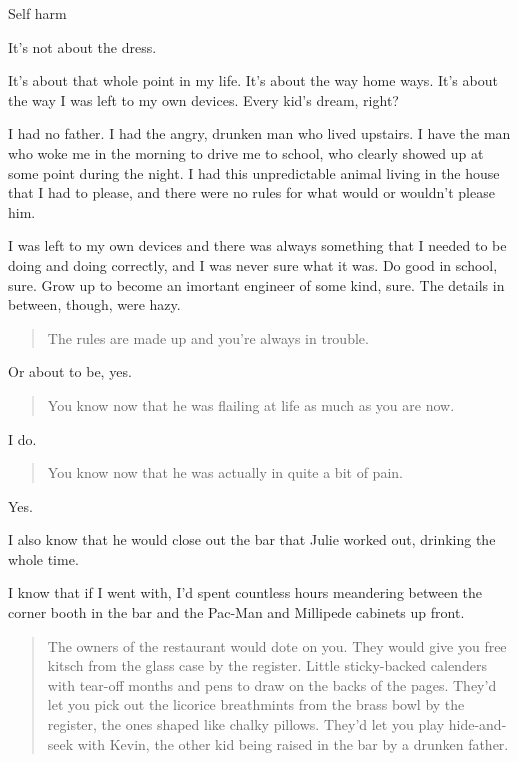 Self harm

It's not about the dress.

It's about that whole point in my life. It's about the way home ways. It's about the way I was left to my own devices. Every kid's dream, right?

I had no father. I had the angry, drunken man who lived upstairs. I have the man who woke me in the morning to drive me to school, who clearly showed up at some point during the night. I had this unpredictable animal living in the house that I had to please, and there were no rules for what would or wouldn't please him.

I was left to my own devices and there was always something that I needed to be doing and doing correctly, and I was never sure what it was. Do good in school, sure. Grow up to become an imortant engineer of some kind, sure. The details in between, though, were hazy.

\begin{quote}
The rules are made up and you're always in trouble.
\end{quote}

Or about to be, yes.

\begin{quote}
You know now that he was flailing at life as much as you are now.
\end{quote}

I do.

\begin{quote}
You know now that he was actually in quite a bit of pain.
\end{quote}

Yes.

I also know that he would close out the bar that Julie worked out, drinking the whole time.

I know that if I went with, I'd spent countless hours meandering between the corner booth in the bar and the Pac-Man and Millipede cabinets up front.

\begin{quote}
The owners of the restaurant would dote on you. They would give you free kitsch from the glass case by the register. Little sticky-backed calenders with tear-off months and pens to draw on the backs of the pages. They'd let you pick out the licorice breathmints from the brass bowl by the register, the ones shaped like chalky pillows. They'd let you play hide-and-seek with Kevin, the other kid being raised in the bar by a drunken father.
\end{quote}

